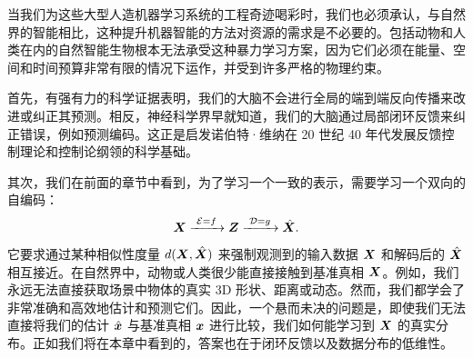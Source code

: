 \documentclass[../../book-main.tex]{subfiles}
\begin{document}
当我们为这些大型人造机器学习系统的工程奇迹喝彩时，我们也必须承认，与自然界的智能相比，这种提升机器智能的方法对资源的需求是不必要的。包括动物和人类在内的自然智能生物根本无法承受这种暴力学习方案，因为它们必须在能量、空间和时间预算非常有限的情况下运作，并受到许多严格的物理约束。

首先，有强有力的科学证据表明，我们的大脑不会进行全局的端到端反向传播来改进或纠正其预测。相反，神经科学界早就知道，我们的大脑通过局部闭环反馈来纠正错误，例如预测编码。这正是启发诺伯特·维纳在 20 世纪 40 年代发展反馈控制理论和控制论纲领的科学基础。

其次，我们在前面的章节中看到，为了学习一个一致的表示，需要学习一个双向的自编码：
\begin{equation}
 \bm{X}
\xrightarrow{\hspace{1mm} \mathcal{E} = f \hspace{1mm}} \bm{Z}  \xrightarrow{\hspace{1mm} \mathcal{D} = g \hspace{1mm}} \hat{\bm{X}}.
\end{equation}
它要求通过某种相似性度量 $d(\bm{X}, \hat {\bm{X}})$ 来强制观测到的输入数据 $\bm{X}$ 和解码后的 $\hat {\bm{X}}$ 相互接近。在自然界中，动物或人类很少能直接接触到基准真相 $\bm{X}$。例如，我们永远无法直接获取场景中物体的真实 3D 形状、距离或动态。然而，我们都学会了非常准确和高效地估计和预测它们。因此，一个悬而未决的问题是，即使我们无法直接将我们的估计 $\hat {\bm{x}}$ 与基准真相 $\bm{x}$ 进行比较，我们如何能学习到 $\bm{X}$ 的真实分布。正如我们将在本章中看到的，答案也在于闭环反馈以及数据分布的低维性。




\end{document}
